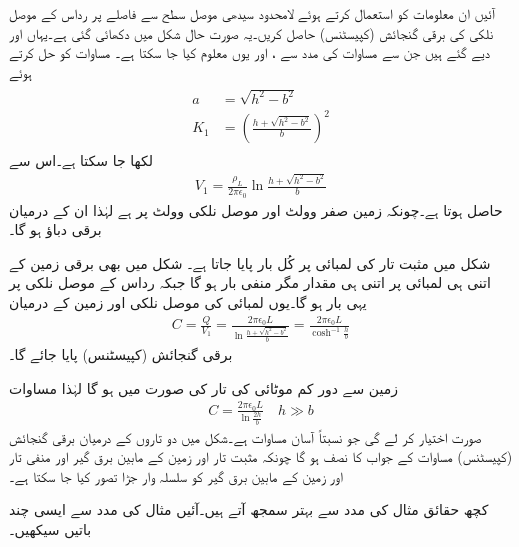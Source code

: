 آئیں ان معلومات کو استعمال کرتے ہوئے لامحدود سیدھی موصل سطح  سے  فاصلے پر  رداس کے موصل نلکی کی برقی گنجائش (کپیسٹنس) حاصل کریں۔یہ صورت حال شکل  میں دکھائی گئی ہے۔یہاں  اور  دیے گئے ہیں جن سے مساوات  کی مدد سے ،  اور یوں  معلوم کیا جا سکتا ہے۔ مساوات  کو حل کرتے ہوئے
\begin{gather}
\begin{aligned}\label{مساوات_کپیسٹر_موصل_نلکی_زمین_متغیرات}
a&=\sqrt{h^2-b^2}\\
K_1&=\left(\frac{h+\sqrt{h^2-b^2}}{b}\right)^2
\end{aligned}
\end{gather} 
لکھا جا سکتا ہے۔اس سے
\begin{align*}
V_1=\frac{\rho_L}{2\pi\epsilon_0} \ln \frac{h+\sqrt{h^2-b^2}}{b}
\end{align*}
حاصل ہوتا ہے۔چونکہ زمین صفر وولٹ اور موصل نلکی  وولٹ پر ہے لہٰذا ان کے درمیان  برقی دباؤ ہو گا۔

شکل  میں مثبت تار کی  لمبائی پر کُل بار  پایا جاتا ہے۔ شکل   میں بھی برقی زمین کے اتنی ہی لمبائی پر اتنی ہی مقدار مگر منفی بار ہو گا جبکہ  رداس کے موصل نلکی پر یہی  بار ہو گا۔یوں  لمبائی کی موصل نلکی اور زمین کے درمیان
\begin{align}\label{مساوات_کپیسٹر_نلکی_زمین_کپیسٹنس}
C=\frac{Q}{V_1}=\frac{2\pi\epsilon_0 L}{ \ln \frac{h+\sqrt{h^2-b^2}}{b}}=\frac{2\pi\epsilon_0 L}{\cosh^{-1} \frac{h}{b}}
\end{align}
برقی گنجائش (کپیسٹنس) پایا جائے گا۔

زمین سے دور کم موٹائی کی تار کی صورت میں  ہو گا لہٰذا مساوات 
\begin{align}\label{مساوات_کپیسٹر_نلکی_زمین_کپیسٹنس_ب}
C=\frac{2\pi\epsilon_0 L}{ \ln \frac{2h}{b}} \quad{h \gg b}
\end{align}
صورت اختیار کر لے گی جو نسبتاً آسان مساوات ہے۔شکل  میں دو تاروں کے درمیان برقی گنجائش (کپیسٹنس) مساوات  کے جواب کا نصف ہو گا چونکہ مثبت تار اور زمین کے مابین برق گیر اور منفی تار اور زمین کے مابین برق گیر کو سلسلہ وار جڑا تصور کیا جا سکتا ہے۔   

کچھ حقائق مثال کی مدد سے بہتر سمجھ آتے ہیں۔آئیں مثال  کی مدد سے ایسی چند باتیں سیکھیں۔

